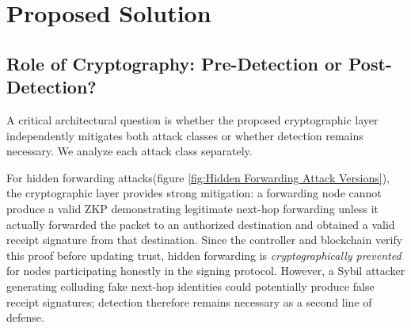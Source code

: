 \documentclass[12pt, a4paper]{report}
\begin{document}
\section{Proposed Solution}

\subsection{Role of Cryptography: Pre-Detection or Post-Detection?}
\label{sec:crypto_role}

A critical architectural question is whether the proposed cryptographic
layer independently mitigates both attack classes
or whether detection remains necessary. We analyze each attack class
separately.

For hidden forwarding attacks(figure \ref{fig:Hidden Forwarding Attack Versions}), the cryptographic layer
provides strong mitigation: a forwarding node cannot produce a valid
ZKP demonstrating legitimate next-hop forwarding unless it actually
forwarded the packet to an authorized destination and obtained a valid
receipt signature from that destination. Since the controller and
blockchain verify this proof before updating trust, hidden forwarding
is \emph{cryptographically prevented} for nodes participating honestly
in the signing protocol. However, a Sybil attacker generating colluding
fake next-hop identities could potentially produce false receipt
signatures; detection therefore remains necessary as a second line of
defense.
\end{document}
